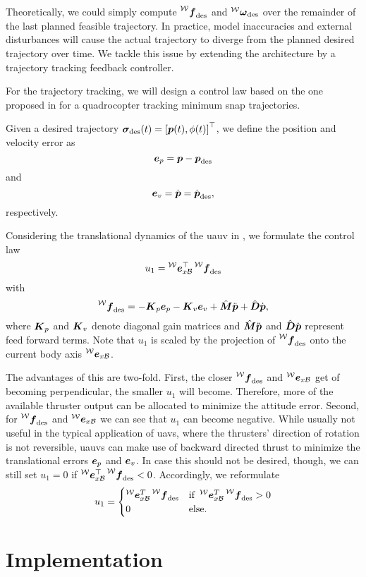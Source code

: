 Theoretically, we could simply compute $\thrustdesiredworld$ and $\vangdesiredworld$ over the remainder of the last planned feasible trajectory.
In practice, model inaccuracies and external disturbances will cause the actual trajectory to diverge from the planned desired trajectory over time.
We tackle this issue by extending the architecture by a trajectory tracking feedback controller.

For the trajectory tracking, we will design a control law based on the one proposed in \cite{MellingerKumar11} for a quadrocopter tracking minimum snap trajectories.

Given a desired trajectory $\bm{\sigma}_{\text{des}}(t) = \left[\mbox{$\bm{p}$}(t), \phi(t)\right]^\top$, we define the position and velocity error as
\begin{equation}
	\mbox{$\bm{e}$}_{p} = \mbox{$\bm{p}$} - \mbox{$\bm{p}$}_{\text{des}}
\end{equation}
and
\begin{equation}
	\mbox{$\bm{e}$}_{v} = \mbox{$\dot{\bm{p}}$} = \mbox{$\dot{\bm{p}}$}_{\text{des}}
	,
\end{equation}
respectively.

Considering the translational dynamics of the \ac{uauv} in , we formulate the control law
\begin{equation}
	\label{eq:translational-control-law-short}
	u_1 = \exbodyinworld^\top \thrustdesiredworld
\end{equation}
with
\begin{equation}
	\thrustdesiredworld =
	-\Kb_p \eb_p
	- \Kb_v \eb_v
	+ \hat{\bm{M}} \pbpp
	+ \hat{\bm{D}} \pbp
	,
\end{equation}
where $\mbox{$\bm{K}$}_p$ and $\mbox{$\bm{K}$}_v$ denote diagonal gain matrices and $\hat{\bm{M}} \mbox{$\ddot{\bm{p}}$}$ and $\hat{\bm{D}}\mbox{$\dot{\bm{p}}$}$ represent feed forward terms. Note that $u_1$ is scaled by the projection of $\thrustdesiredworld$ onto the current body axis $\prescript{\mathcal{W}}{}{\mbox{$\bm{e}$}}_{x\mathcal{B}}$.

The advantages of this are two-fold. First, the closer $\thrustdesiredworld$ and $\prescript{\mathcal{W}}{}{\mbox{$\bm{e}$}}_{x\mathcal{B}}$ get of becoming perpendicular, the smaller $u_1$ will become. Therefore, more of the available thruster output can be allocated to minimize the attitude error. Second, for $\thrustdesiredworld$ and $\prescript{\mathcal{W}}{}{\mbox{$\bm{e}$}}_{x\mathcal{B}}$ we can see that $u_1$ can become negative. While usually not useful in the typical application of \acp{uav}, where the thrusters' direction of rotation is not reversible, \acp{uauv} can make use of backward directed thrust to minimize the translational errors $\mbox{$\bm{e}$}_p$ and $\mbox{$\bm{e}$}_v$. In case this should not be desired, though, we can still set $u_1=0$ if $\exbodyinworld^\top \thrustdesiredworld < 0$. Accordingly, we reformulate 
\begin{equation}
	u_1 = 
	\begin{cases}
		\exbodyinworld^T \thrustdesiredworld & \text{if } \exbodyinworld^T \thrustdesiredworld > 0 \\
		0 & \text{else.}
	\end{cases}
\end{equation}




\section{Implementation}
\label{sec:implementation}
